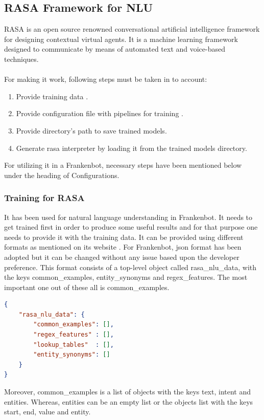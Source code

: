\subsection{RASA Framework for NLU}
RASA is an open source renowned conversational artificial intelligence framework for designing contextual virtual agents. It is a machine learning framework designed to communicate by means of automated text and voice-based techniques. \cite{rasa}
\\~\\
For making it work, following steps must be taken in to account:
\begin{enumerate}
    \item Provide training data \cite{rasatrainingdata}.
    \item Provide configuration file with pipelines for training \cite{rasapipeline}.
    \item Provide directory's path to save trained models.
    \item Generate rasa interpreter by loading it from the trained models directory.
\end{enumerate}
For utilizing it in a Frankenbot, necessary steps have been mentioned below under the heading of Configurations.
 
\subsubsection*{Training for RASA}
It has been used for natural language understanding in Frankenbot. It needs to get trained first in order to produce some useful results and for that purpose one needs to provide it with the training data. It can be provided using different formats as mentioned on its website \cite{rasatrainingdata}. For Frankenbot, json format has been adopted but it can be changed without any issue based upon the developer preference. This format consists of a top-level object called rasa\_nlu\_data, with the keys common\_examples, entity\_synonyms and regex\_features. The most important one out of these all is common\_examples.

\begin{lstlisting}[language=json,firstnumber=1]
{
    "rasa_nlu_data": {
        "common_examples": [],
        "regex_features" : [],
        "lookup_tables"  : [],
        "entity_synonyms": []
    }
}
\end{lstlisting}
 Moreover, common\_examples is a list of objects with the keys text, intent and entities. Whereas, entities can be an empty list or the objects list with the keys start, end, value and entity.
 
